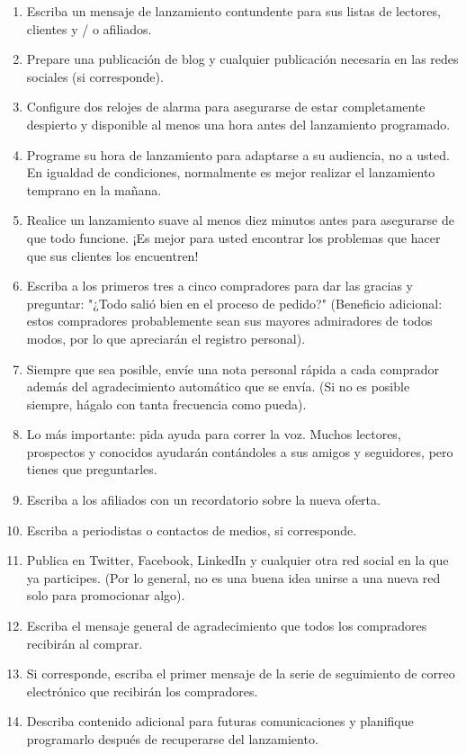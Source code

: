 \documentclass[10pt]{book}
\begin{document}
\begin{enumerate}[\bfseries 1.]
		\item Escriba un mensaje de lanzamiento contundente para sus listas de lectores, clientes y / o afiliados.
		\item Prepare una publicación de blog y cualquier publicación necesaria en las redes sociales (si corresponde).
		\item Configure dos relojes de alarma para asegurarse de estar completamente despierto y disponible al menos una hora antes del lanzamiento programado.
		\item Programe su hora de lanzamiento para adaptarse a su audiencia, no a usted. En igualdad de condiciones, normalmente es mejor realizar el lanzamiento temprano en la mañana.
		\item Realice un lanzamiento suave al menos diez minutos antes para asegurarse de que todo funcione. ¡Es mejor para usted encontrar los problemas que hacer que sus clientes los encuentren!
		\item Escriba a los primeros tres a cinco compradores para dar las gracias y preguntar: "¿Todo salió bien en el proceso de pedido?" (Beneficio adicional: estos compradores probablemente sean sus mayores admiradores de todos modos, por lo que apreciarán el registro personal). 
		\item Siempre que sea posible, envíe una nota personal rápida a cada comprador además del agradecimiento automático que se envía. (Si no es posible siempre, hágalo con tanta frecuencia como pueda).
		\item Lo más importante: pida ayuda para correr la voz. Muchos lectores, prospectos y conocidos ayudarán contándoles a sus amigos y seguidores, pero tienes que preguntarles.
		\item Escriba a los afiliados con un recordatorio sobre la nueva oferta.
		\item Escriba a periodistas o contactos de medios, si corresponde.
		\item Publica en Twitter, Facebook, LinkedIn y cualquier otra red social en la que ya participes. (Por lo general, no es una buena idea unirse a una nueva red solo para promocionar algo).
		\item Escriba el mensaje general de agradecimiento que todos los compradores recibirán al comprar.
		\item Si corresponde, escriba el primer mensaje de la serie de seguimiento de correo electrónico que recibirán los compradores.
		\item Describa contenido adicional para futuras comunicaciones y planifique programarlo después de recuperarse del lanzamiento.

\end{enumerate}
\end{document}
